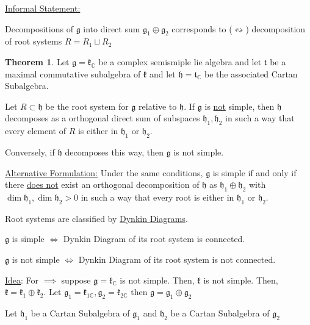 \documentclass{article}
\theoremstyle{definition}
\newtheorem{theorem}{Theorem}
\begin{document}
\underline{Informal Statement:}

Decompositions of \(\mathfrak{g} \) into direct sum \(\mathfrak{g}_1 \oplus \mathfrak{g}_2  \)  corresponds to (\(\leftrightsquigarrow\)) decomposition of root systems \(R=R_1\sqcup R_2\) 

\begin{theorem}
    Let \(\mathfrak{g} = \mathfrak{k} _\mathbb{C} \) be a complex semismiple lie algebra and let \(\mathfrak{t} \) be a maximal commutative subalgebra of \(\mathfrak{k} \) and let \(\mathfrak{h}=\mathfrak{t}_\mathbb{C} \) be the associated Cartan Subalgebra.

    Let \(R \subset \mathfrak{h} \) be the root system for \(\mathfrak{g} \) relative to \(\mathfrak{h} \). If \(\mathfrak{g} \) is \underline{not} simple, then \(\mathfrak{h} \) decomposes as a orthogonal direct sum of subspaces \(\mathfrak{h}_1,\mathfrak{h}_2  \) in such a way that every element of \(R\) is either in \(\mathfrak{h}_1 \) or \(\mathfrak{h}_2 \).

    Conversely, if \(\mathfrak{h} \) decomposes this way, then \(\mathfrak{g} \) is not simple.

\end{theorem}

\underline{Alternative Formulation:} Under the same conditions, \(\mathfrak{g} \) is simple if and only if there \underline{does not} exist an orthogonal decomposition of \(\mathfrak{h} \) as \(\mathfrak{h}_1 \oplus \mathfrak{h}_2  \) with \(\dim \mathfrak{h}_1,\dim \mathfrak{h}_2 > 0\) in such a way that every root is either in \(\mathfrak{h}_1\) or \(\mathfrak{h} _2\).

Root systems are classified by \underline{Dynkin Diagrams}.

\(\mathfrak{g} \) is simple \(\iff \) Dynkin Diagram of its root system is connected.

\(\mathfrak{g} \) is not simple \(\iff \) Dynkin Diagram of its root system is not connected.

\underline{Idea}: For \(\implies\) suppose \(\mathfrak{g}=\mathfrak{k}_\mathbb{C}  \) is not simple. Then, \(\mathfrak{k} \) is not simple. Then, \(\mathfrak{k}=\mathfrak{k}_1 \oplus \mathfrak{k}_2   \). Let \(\mathfrak{g}_1 = \mathfrak{k}_{1\mathbb{C}}, \mathfrak{g}_2=\mathfrak{k}_{2\mathbb{C}}    \) then \(\mathfrak{g}=\mathfrak{g}_1 \oplus \mathfrak{g} _2   \) 

Let \(\mathfrak{h} _1\) be a Cartan Subalgebra of \(\mathfrak{g} _1\) and \(\mathfrak{h} _2\) be a Cartan Subalgebra of \(\mathfrak{g} _2\) 
\end{document}
